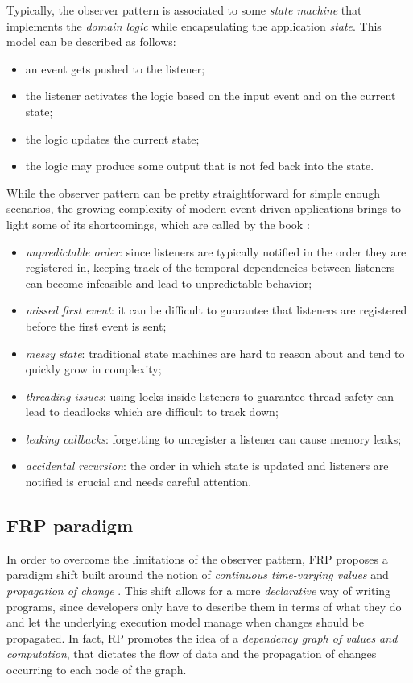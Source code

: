 Typically, the observer pattern is associated to some \textit{state machine} that implements the \textit{domain logic} while encapsulating the application \textit{state}.
%
This model can be described as follows:
%
\begin{itemize}
    \item an event gets pushed to the listener;
    \item the listener activates the logic based on the input event and on the current state;
    \item the logic updates the current state;
    \item the logic may produce some output that is not fed back into the state.
\end{itemize}

While the observer pattern can be pretty straightforward for simple enough scenarios, the growing complexity of modern event-driven applications brings to light some of its shortcomings, which are called by the book :
%
\begin{itemize}
    \item \textit{unpredictable order}: since listeners are typically notified in the order they are registered in, keeping track of the temporal dependencies between listeners can become infeasible and lead to unpredictable behavior;
    \item \textit{missed first event}: it can be difficult to guarantee that listeners are registered before the first event is sent;
    \item \textit{messy state}: traditional state machines are hard to reason about and tend to quickly grow in complexity;
    \item \textit{threading issues}: using locks inside listeners to guarantee thread safety can lead to deadlocks which are difficult to track down;
    \item \textit{leaking callbacks}: forgetting to unregister a listener can cause memory leaks;
    \item \textit{accidental recursion}: the order in which state is updated and listeners are notified is crucial and needs careful attention.
\end{itemize}

\subsection{FRP paradigm}
\label{sec:frp-paradigm}

In order to overcome the limitations of the observer pattern, FRP proposes a paradigm shift built around the notion of \textit{continuous time-varying values} and \textit{propagation of change} \cite{bainomugisha2013survey}.
%
This shift allows for a more \textit{declarative} way of writing programs, since developers only have to describe them in terms of what they do and let the underlying execution model manage when changes should be propagated.
%
In fact, RP promotes the idea of a \textit{dependency graph of values and computation}, that dictates the flow of data and the propagation of changes occurring to each node of the graph.

